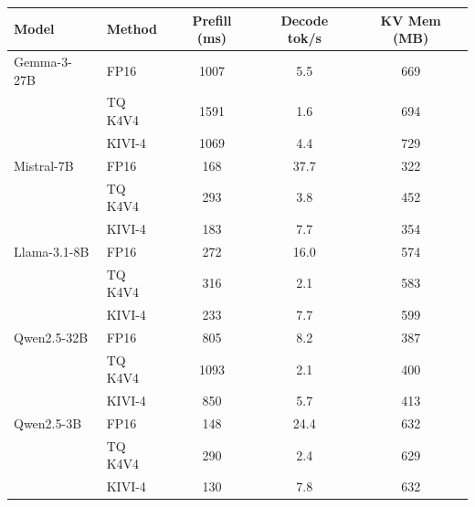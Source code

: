 \begin{tabular}{l l c c c}
\toprule
Model & Method & Prefill (ms) & Decode tok/s & KV Mem (MB) \\
\midrule
Gemma-3-27B & FP16 & 1007 & 5.5 & 669 \\
 & TQ K4V4 & 1591 & 1.6 & 694 \\
 & KIVI-4 & 1069 & 4.4 & 729 \\
\midrule
Mistral-7B & FP16 & 168 & 37.7 & 322 \\
 & TQ K4V4 & 293 & 3.8 & 452 \\
 & KIVI-4 & 183 & 7.7 & 354 \\
\midrule
Llama-3.1-8B & FP16 & 272 & 16.0 & 574 \\
 & TQ K4V4 & 316 & 2.1 & 583 \\
 & KIVI-4 & 233 & 7.7 & 599 \\
\midrule
Qwen2.5-32B & FP16 & 805 & 8.2 & 387 \\
 & TQ K4V4 & 1093 & 2.1 & 400 \\
 & KIVI-4 & 850 & 5.7 & 413 \\
\midrule
Qwen2.5-3B & FP16 & 148 & 24.4 & 632 \\
 & TQ K4V4 & 290 & 2.4 & 629 \\
 & KIVI-4 & 130 & 7.8 & 632 \\
\bottomrule
\end{tabular}